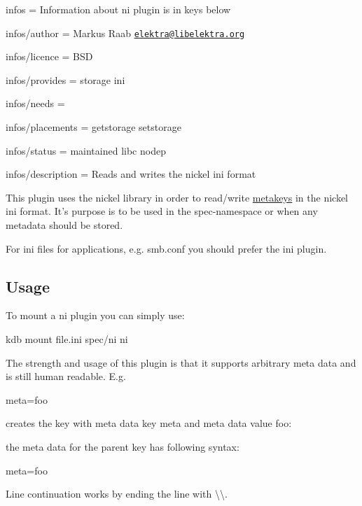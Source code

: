 
\begin{DoxyItemize}
\item infos = Information about ni plugin is in keys below
\item infos/author = Markus Raab \href{mailto:elektra@libelektra.org}{\tt elektra@libelektra.\+org}
\item infos/licence = B\+S\+D
\item infos/provides = storage ini
\item infos/needs =
\item infos/placements = getstorage setstorage
\item infos/status = maintained libc nodep
\item infos/description = Reads and writes the nickel ini format
\end{DoxyItemize}

This plugin uses the nickel library in order to read/write \hyperlink{md_doc_help_elektra-meta-data_doc_help_elektra-meta-data_md}{metakeys} in the nickel ini format. It's purpose is to be used in the {\ttfamily spec}-\/namespace or when any metadata should be stored.

For ini files for applications, e.\+g. smb.\+conf you should prefer the ini plugin.

\subsection*{Usage}

To mount a ni plugin you can simply use\+: \begin{DoxyVerb}kdb mount file.ini spec/ni ni
\end{DoxyVerb}


The strength and usage of this plugin is that it supports arbitrary meta data and is still human readable. E.\+g. \begin{DoxyVerb}[key]
meta=foo
\end{DoxyVerb}


creates the key with meta data key {\ttfamily meta} and meta data value {\ttfamily foo}\+: 


the meta data for the parent key has following syntax\+: \begin{DoxyVerb}[]
meta=foo
\end{DoxyVerb}


Line continuation works by ending the line with {\ttfamily \textbackslash{}\textbackslash{}}.

